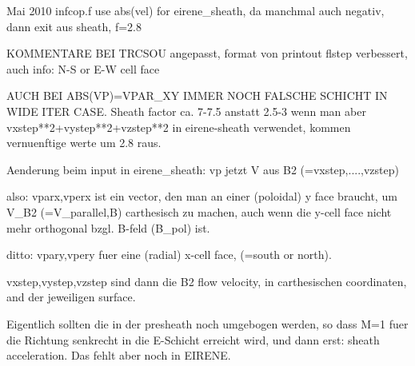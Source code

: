 Mai 2010
infcop.f
use abs(vel) for eirene_sheath, da manchmal auch negativ,
                                dann exit aus sheath, f=2.8

KOMMENTARE BEI TRCSOU angepasst, 
format von printout flstep verbessert, auch info:  N-S or E-W cell face

AUCH BEI ABS(VP)=VPAR_XY IMMER NOCH FALSCHE SCHICHT IN WIDE ITER CASE.
Sheath factor ca. 7-7.5 anstatt 2.5-3
wenn man aber vxstep**2+vystep**2+vzstep**2 in eirene-sheath
verwendet, kommen vernuenftige werte um 2.8 raus.

Aenderung beim input in eirene_sheath: vp jetzt V aus B2
(=vxstep,....,vzstep)



also: vparx,vperx ist ein vector, den man an einer (poloidal) y face
braucht, um V_B2 (=V_parallel,B) carthesisch zu machen, auch wenn die
y-cell face nicht mehr orthogonal bzgl. B-feld (B_pol) ist.

ditto: vpary,vpery fuer eine (radial) x-cell face, (=south or north).

vxstep,vystep,vzstep sind dann die B2 flow velocity, in carthesischen
coordinaten, and der jeweiligen surface.

Eigentlich sollten die in der presheath noch umgebogen werden,
so dass M=1 fuer die Richtung senkrecht in die E-Schicht erreicht wird,
und dann erst: sheath acceleration.
Das fehlt aber noch in EIRENE.










